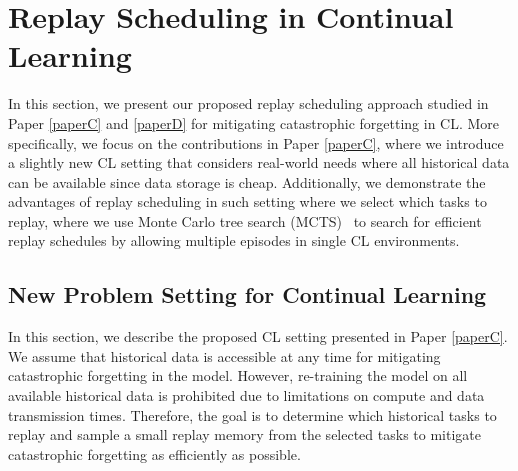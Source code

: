 \section{Replay Scheduling in Continual Learning}\label{chap4:sec:replay_scheduling_in_cl}

In this section, we present our proposed replay scheduling approach studied in Paper \ref{paperC} and \ref{paperD} for mitigating catastrophic forgetting in CL. 
More specifically, we focus on the contributions in Paper \ref{paperC}, where we introduce a slightly new CL setting that considers real-world needs where all historical data can be available since data storage is cheap. Additionally, we demonstrate the advantages of replay scheduling in such setting where we select which tasks to replay, where we use Monte Carlo tree search (MCTS)~\cite{coulom2006efficient} to search for efficient replay schedules by allowing multiple episodes in single CL environments. 




\subsection{New Problem Setting for Continual Learning}

In this section, we describe the proposed CL setting presented in Paper \ref{paperC}. We assume that historical data is accessible at any time for mitigating catastrophic forgetting in the model. However, re-training the model on all available historical data is prohibited due to limitations on compute and data transmission times. Therefore, the goal is to determine which historical tasks to replay and sample a small replay memory from the selected tasks to mitigate catastrophic forgetting as efficiently as possible. 

